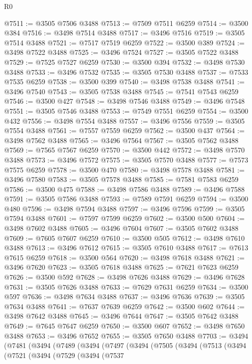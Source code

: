 \begin{lexlean}{R0}
\begin{coremodule}
@7511 := @3505 @7506 @3488
@7513 := @7509 @7511 @6259
@7514 := @3500 @384
@7516 := @3498 @7514 @3488
@7517 := @3496 @7516
@7519 := @3505 @7514 @3488
@7521 := @7517 @7519 @6259
@7522 := @3500 @389
@7524 := @3498 @7522 @3488
@7525 := @3496 @7524
@7527 := @3505 @7522 @3488
@7529 := @7525 @7527 @6259
@7530 := @3500 @394
@7532 := @3498 @7530 @3488
@7533 := @3496 @7532
@7535 := @3505 @7530 @3488
@7537 := @7533 @7535 @6259
@7538 := @3500 @399
@7540 := @3498 @7538 @3488
@7541 := @3496 @7540
@7543 := @3505 @7538 @3488
@7545 := @7541 @7543 @6259
@7546 := @3500 @427
@7548 := @3498 @7546 @3488
@7549 := @3496 @7548
@7551 := @3505 @7546 @3488
@7553 := @7549 @7551 @6259
@7554 := @3500 @432
@7556 := @3498 @7554 @3488
@7557 := @3496 @7556
@7559 := @3505 @7554 @3488
@7561 := @7557 @7559 @6259
@7562 := @3500 @437
@7564 := @3498 @7562 @3488
@7565 := @3496 @7564
@7567 := @3505 @7562 @3488
@7569 := @7565 @7567 @6259
@7570 := @3500 @442
@7572 := @3498 @7570 @3488
@7573 := @3496 @7572
@7575 := @3505 @7570 @3488
@7577 := @7573 @7575 @6259
@7578 := @3500 @470
@7580 := @3498 @7578 @3488
@7581 := @3496 @7580
@7583 := @3505 @7578 @3488
@7585 := @7581 @7583 @6259
@7586 := @3500 @475
@7588 := @3498 @7586 @3488
@7589 := @3496 @7588
@7591 := @3505 @7586 @3488
@7593 := @7589 @7591 @6259
@7594 := @3500 @480
@7596 := @3498 @7594 @3488
@7597 := @3496 @7596
@7599 := @3505 @7594 @3488
@7601 := @7597 @7599 @6259
@7602 := @3500 @500
@7604 := @3498 @7602 @3488
@7605 := @3496 @7604
@7607 := @3505 @7602 @3488
@7609 := @7605 @7607 @6259
@7610 := @3500 @505
@7612 := @3498 @7610 @3488
@7613 := @3496 @7612
@7615 := @3505 @7610 @3488
@7617 := @7613 @7615 @6259
@7618 := @3500 @564
@7620 := @3498 @7618 @3488
@7621 := @3496 @7620
@7623 := @3505 @7618 @3488
@7625 := @7621 @7623 @6259
@7626 := @3500 @592
@7628 := @3498 @7626 @3488
@7629 := @3496 @7628
@7631 := @3505 @7626 @3488
@7633 := @7629 @7631 @6259
@7634 := @3500 @597
@7636 := @3498 @7634 @3488
@7637 := @3496 @7636
@7639 := @3505 @7634 @3488
@7641 := @7637 @7639 @6259
@7642 := @3500 @602
@7644 := @3498 @7642 @3488
@7645 := @3496 @7644
@7647 := @3505 @7642 @3488
@7649 := @7645 @7647 @6259
@7650 := @3500 @607
@7652 := @3498 @7650 @3488
@7653 := @3496 @7652
@7655 := @3505 @7650 @3488
@7703 := @3494
    (@7481
      (@3494
        (@7489
          (@3494
            (@7497
              (@3494
                (@7505
                  (@3494
                    (@7513
                      (@3494
                        (@7521
                          (@3494
                            (@7529
                              (@3494
                                (@7537

\end{coremodule}
\end{lexlean}
